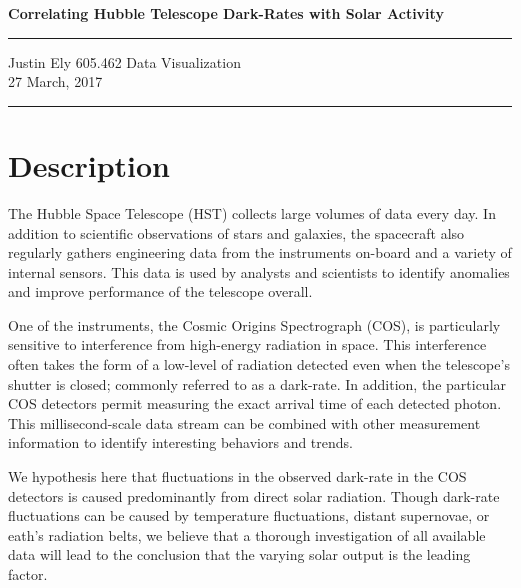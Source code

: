 \documentclass[a4paper,11pt]{article}
\begin{document}
\begin{flushright}

\vspace{1.1cm}

{\bf\Huge Correlating Hubble Telescope Dark-Rates with Solar Activity}

\rule{0.25\linewidth}{0.5pt}

\vspace{0.5cm}
Justin Ely
\linebreak
\newline
\footnotesize{605.462 Data Visualization \\}
\vspace{0.5cm}
27 March, 2017
\end{flushright}

\noindent\rule{\linewidth}{1.0pt}


\section{Description}
The Hubble Space Telescope (HST) collects large volumes of data every day.  In addition to scientific observations of stars and galaxies, the spacecraft also regularly gathers engineering data from the instruments on-board and a variety of internal sensors.  This data is used by analysts and scientists to identify anomalies and improve performance of the telescope overall.  

One of the instruments, the Cosmic Origins Spectrograph (COS), is particularly sensitive to interference from high-energy radiation in space.  This interference often takes the form of a low-level of radiation detected even when the telescope's shutter is closed; commonly referred to as a dark-rate.  In addition, the particular COS detectors permit measuring the exact arrival time of each detected photon.  This millisecond-scale data stream can be combined with other measurement information to identify interesting behaviors and trends. 

We hypothesis here that fluctuations in the observed dark-rate in the COS detectors is caused predominantly from direct solar radiation.  Though dark-rate fluctuations can be caused by temperature fluctuations, distant supernovae, or eath's radiation belts, we believe that a thorough investigation of all available data will lead to the conclusion that the varying solar output is the leading factor. 
\end{document}
